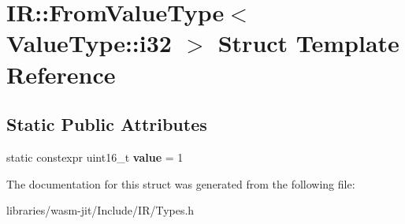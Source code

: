 \hypertarget{struct_i_r_1_1_from_value_type_3_01_value_type_1_1i32_01_4}{}\section{IR\+:\+:From\+Value\+Type$<$ Value\+Type\+:\+:i32 $>$ Struct Template Reference}
\label{struct_i_r_1_1_from_value_type_3_01_value_type_1_1i32_01_4}
\subsection*{Static Public Attributes}
\begin{DoxyCompactItemize}
\item 
\mbox{\label{struct_i_r_1_1_from_value_type_3_01_value_type_1_1i32_01_4_a26ac2f23e314258f6bcce959fbf9ceff}} 
static constexpr uint16\+\_\+t {\bfseries value} = 1
\end{DoxyCompactItemize}


The documentation for this struct was generated from the following file\+:\begin{DoxyCompactItemize}
\item 
libraries/wasm-\/jit/\+Include/\+I\+R/Types.\+h\end{DoxyCompactItemize}

